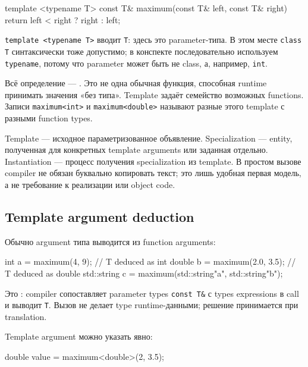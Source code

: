 \begin{cppcode}
template <typename T>
const T& maximum(const T& left, const T& right) {
    return left < right ? right : left;
}
\end{cppcode}

\texttt{template <typename T>} вводит  \texttt{T}:
здесь это parameter-типа. В этом месте \texttt{class T} синтаксически тоже
допустимо; в конспекте последовательно используем \texttt{typename}, потому
что parameter может быть не class, а, например, \texttt{int}.

Всё определение --- . Это не одна
обычная функция, способная runtime принимать значения «без типа». Template
задаёт семейство возможных functions. Записи \texttt{maximum<int>} и
\texttt{maximum<double>} называют разные  этого
template с разными function types.

\begin{standardbox}
Template --- исходное параметризованное объявление. Specialization --- entity,
полученная для конкретных template arguments или заданная отдельно.
Instantiation --- процесс получения specialization из template. В простом
вызове compiler не обязан буквально копировать текст; это лишь удобная первая
модель, а не требование к реализации или object code.
\end{standardbox}

\subsection{Template argument deduction}

Обычно argument типа выводится из function arguments:

\begin{cppcode}
int a = maximum(4, 9);              // T deduced as int
double b = maximum(2.0, 3.5);       // T deduced as double
std::string c = maximum(std::string{"a"}, std::string{"b"});
\end{cppcode}

Это : compiler сопоставляет parameter types
\texttt{const T\&} с types expressions в call и выводит \texttt{T}. Вызов не
делает type runtime-данными; решение принимается при translation.

Template argument можно указать явно:

\begin{cppcode}
double value = maximum<double>(2, 3.5);
\end{cppcode}


